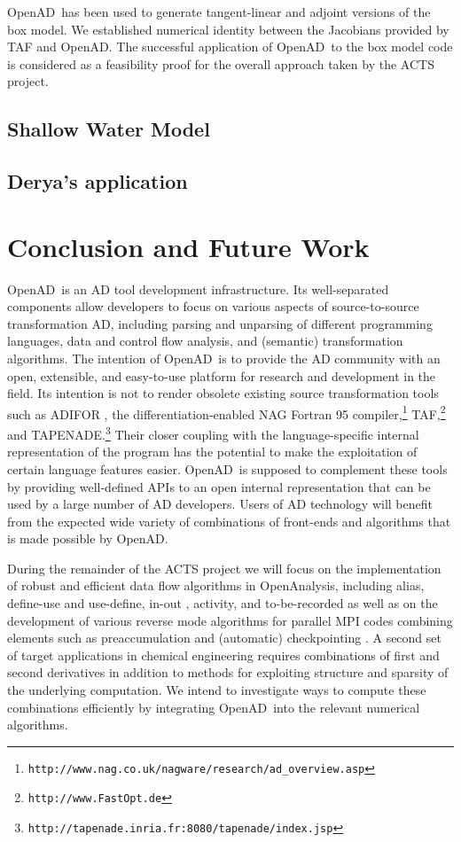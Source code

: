 \documentclass[11pt]{article}
\newcommand{\OpenAD}{OpenAD}
\newcommand{\OpenAnalysis}{OpenAnalysis}
\begin{document}
\OpenAD\ has been used to generate tangent-linear and 
adjoint versions of the box model. We established numerical identity between
the Jacobians provided by TAF and \OpenAD.
The successful 
application of \OpenAD\ to the box model code is considered as a feasibility 
proof for the overall approach taken by the ACTS project.  
\subsection{Shallow Water Model}
\subsection{Derya's application}
\section{Conclusion and Future Work}

\OpenAD\ is an AD tool development infrastructure. Its well-separated components
allow developers to focus on various aspects of source-to-source 
transformation AD, including parsing and unparsing of different programming
languages, data and control flow analysis, and (semantic) transformation 
algorithms. The intention of \OpenAD\ is to provide the AD community with 
an open, extensible, and easy-to-use platform for research and development
in the field. Its intention is not to render obsolete existing source transformation
tools such as ADIFOR \cite{adiforWeb}, 
the differentiation-enabled NAG Fortran 95 
compiler,\footnote{{\tt http://www.nag.co.uk/nagware/research/ad\_overview.asp}} TAF,\footnote{{\tt http://www.FastOpt.de}} and TAPENADE.\footnote{{\tt http://tapenade.inria.fr:8080/tapenade/index.jsp}} 
Their closer coupling with the language-specific internal representation of 
the program has the potential to make the
exploitation of certain language features easier. \OpenAD\ is supposed to 
complement these tools by providing well-defined APIs to an open internal 
representation that can be used by a large number of AD developers.
Users of AD technology will benefit from the expected wide
variety of combinations of front-ends and algorithms that is made possible
by \OpenAD.

During the remainder of the ACTS project we will focus on the implementation
of robust and efficient data flow algorithms in \OpenAnalysis, including alias, 
define-use and use-define, in-out \cite{Muc97}, 
activity, and to-be-recorded \cite{HNP02} as well as on 
the development of various reverse mode algorithms for parallel MPI codes
combining elements such as preaccumulation and (automatic) checkpointing
\cite{Gri92}. 
A second set of target 
applications in chemical engineering \cite{FTB97} requires combinations of first and 
second derivatives in addition to methods for exploiting structure and sparsity
of the underlying computation. We intend to investigate ways to compute these
combinations efficiently by integrating \OpenAD\ into the relevant 
numerical algorithms.
\end{document}
